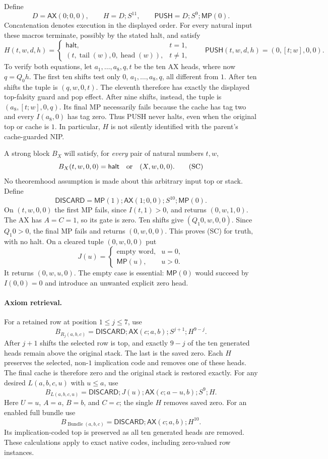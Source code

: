 Define
\[
 D=\mathsf{AX}(0;0,0),\qquad H=D;S^{11},\qquad
 \mathsf{PUSH}=D;S^9;\mathsf{MP}(0).
\]
Concatenation denotes execution in the displayed order.  For every natural
input these macros terminate, possibly by the stated halt, and satisfy
\[
 H(t,w,d,h)=
 \begin{cases}
  \mathsf{halt},&t=1,\\
  (t,\operatorname{tail}(w),0,\operatorname{head}(w)),&t\ne1,
 \end{cases}
 \qquad
 \mathsf{PUSH}(t,w,d,h)=(0,[t;w],0,0).
\]
To verify both equations, let $a_1,\ldots,a_8,q,t$ be the ten AX
heads, where now $q=Q_0h$.  The first ten shifts test only $0$,
$a_1,\ldots,a_8,q$, all different from $1$.  After ten shifts the
tuple is $(q,w,0,t)$.  The eleventh therefore has exactly the displayed
top-falsity guard and pop effect.  After nine shifts, instead, the tuple
is $(a_8,[t;w],0,q)$.  Its final MP necessarily fails because the cache
has tag two and every $I(a_8,0)$ has tag zero.  Thus PUSH never halts,
even when the original top or cache is $1$.  In particular, $H$ is not
silently identified with the parent's cache-guarded NIP.

A strong block $B_X$ will satisfy, for \emph{every} pair of natural
numbers $t,w$,
\[
 B_X(t,w,0,0)=\mathsf{halt}\quad\hbox{or}\quad(X,w,0,0).
 \tag{SC}
\]
No theoremhood assumption is made about this arbitrary input top or stack.
Define
\[
 \mathsf{DISCARD}=\mathsf{MP}(1);\mathsf{AX}(1;0,0);
                      S^{10};\mathsf{MP}(0).
\]
On $(t,w,0,0)$ the first MP fails, since $I(t,1)>0$, and returns
$(0,w,1,0)$.  The AX has $A=C=1$, so its gate is zero.  Ten shifts
give $(Q_1 0,w,0,0)$.  Since $Q_1 0>0$, the final MP fails and returns
$(0,w,0,0)$.  This proves (SC) for truth, with no halt.
On a cleared tuple $(0,w,0,0)$ put
\[
 J(u)=
 \begin{cases}
  \text{empty word},&u=0,\\
  \mathsf{MP}(u),&u>0.
 \end{cases}
\]
It returns $(0,w,u,0)$.  The empty case is essential: $\mathsf{MP}(0)$
would succeed by $I(0,0)=0$ and introduce an unwanted explicit zero head.

\paragraph{Axiom retrieval.}
For a retained row at position $1\le j\le7$, use
\[
 B_{R_j(a,b,c)}=
 \mathsf{DISCARD};\mathsf{AX}(c;a,b);S^{j+1};H^{9-j}.
\]
After $j+1$ shifts the selected row is top, and exactly $9-j$ of
the ten generated heads remain above the original stack.  The last is
the saved zero.  Each $H$ preserves the selected, non-$1$ implication
code and removes one of these heads.  The final cache is therefore zero
and the original stack is restored exactly.  For any desired
$L(a,b,c,u)$ with $u\le a$, use
\[
 B_{L(a,b,c,u)}=
 \mathsf{DISCARD};J(u);\mathsf{AX}(c;a-u,b);S^9;H.
\]
Here $U=u$, $A=a$, $B=b$, and $C=c$; the single $H$ removes saved zero.
For an enabled full bundle use
\[
 B_{\operatorname{Bundle}(a,b,c)}=
 \mathsf{DISCARD};\mathsf{AX}(c;a,b);H^{10}.
\]
Its implication-coded top is preserved as all ten generated heads are
removed.  These calculations apply to exact native codes, including
zero-valued row instances.

